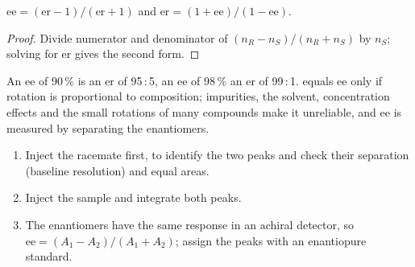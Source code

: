 \begin{proposition}[ee and er]\label{prop:b3:asymmetric-synthesis:ee-er}
$\mathrm{ee} = (\mathrm{er} - 1)/(\mathrm{er} + 1)$ and $\mathrm{er} = (1 + \mathrm{ee})/(1 - \mathrm{ee})$.
\end{proposition}

\begin{proof}
Divide numerator and denominator of $(n_R - n_S)/(n_R + n_S)$ by $n_S$; solving for er gives the
second form.
\end{proof}

An ee of 90\,\% is an er of 95\,:\,5, an ee of 98\,\% an er of 99\,:\,1. 
equals ee only if rotation is proportional to composition; impurities, the
solvent, concentration effects and the small rotations of many compounds make
it unreliable, and ee is measured by separating the enantiomers.

\begin{method}\label{met:b3:asymmetric-synthesis:ee-chromatogram}
\begin{enumerate}
  \item Inject the racemate first, to identify the two peaks and check their
        separation (baseline resolution) and equal areas.
  \item Inject the sample and integrate both peaks.
  \item The enantiomers have the same response in an achiral detector, so
        $\mathrm{ee} = (A_1 - A_2)/(A_1 + A_2)$; assign the peaks with an enantiopure standard.
\end{enumerate}
\end{method}

